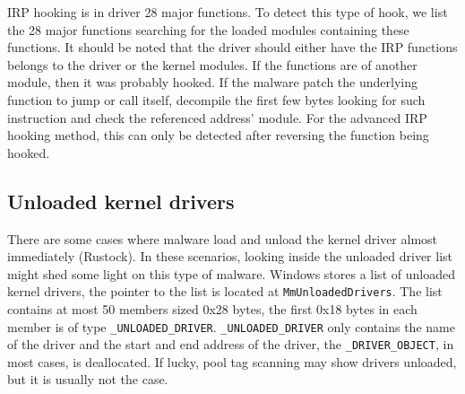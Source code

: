 IRP hooking is in driver 28 major functions. To detect this type of hook, we
list the 28 major functions searching for the loaded modules containing these
functions. It should be noted that the driver should either have the IRP
functions belongs to the driver or the kernel modules. If the functions are of
another module, then it was probably hooked. If the malware patch the
underlying function to jump or call itself, decompile the first few bytes
looking for such instruction and check the referenced address' module. For
the advanced IRP hooking method, this can only be detected after reversing the
function being hooked.


\subsection[Unloaded kernel drivers]{Unloaded kernel drivers}

There are some cases where malware load and unload the kernel driver almost
immediately (Rustock). In these scenarios, looking inside the unloaded driver
list might shed some light on this type of malware. Windows stores a list of
unloaded kernel drivers, the pointer to the list is located at
\texttt{MmUnloadedDrivers}. The list contains at most 50 members sized 0x28
bytes, the first 0x18 bytes in each member is of type
\texttt{\_UNLOADED\_DRIVER}.  \texttt{\_UNLOADED\_DRIVER} only contains the
name of the driver and the start and end address of the driver, the
\texttt{\_DRIVER\_OBJECT}, in most cases, is deallocated. If lucky, pool tag
scanning may show drivers unloaded, but it is usually not the case.
